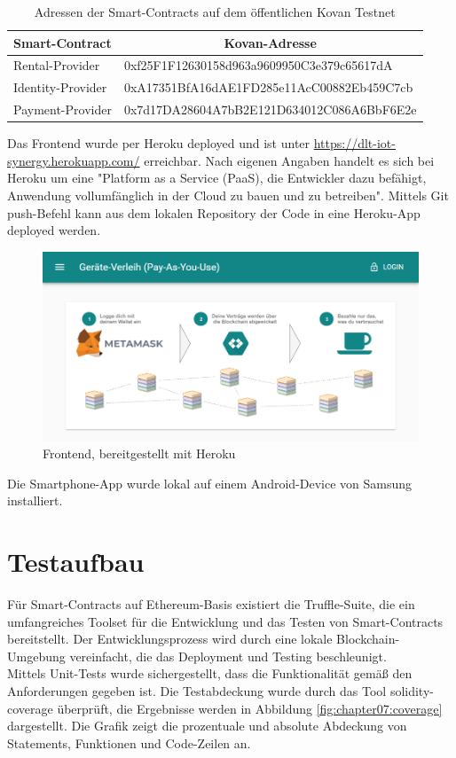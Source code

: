 \begin{table}[htbp]
\caption{Adressen der Smart-Contracts auf dem öffentlichen Kovan Testnet}
\label{tab:addresses}
\begin{tabular}{@{}ll@{}}
\toprule
\textbf{Smart-Contract} & \multicolumn{1}{c}{\textbf{Kovan-Adresse}} \\ \midrule
Rental-Provider & 0xf25F1F12630158d963a9609950C3e379c65617dA \\
Identity-Provider & 0xA17351BfA16dAE1FD285e11AcC00882Eb459C7cb \\
Payment-Provider & 0x7d17DA28604A7bB2E121D634012C086A6BbF6E2e \\ \bottomrule
\end{tabular}
\end{table}

Das Frontend wurde per Heroku deployed und ist unter \url{https://dlt-iot-synergy.herokuapp.com/} erreichbar. Nach eigenen Angaben handelt es sich bei Heroku um eine "Platform as a Service (PaaS), die Entwickler dazu befähigt, Anwendung vollumfänglich in der Cloud zu bauen und zu betreiben". Mittels Git push-Befehl kann aus dem lokalen Repository der Code in eine Heroku-App deployed werden.

\begin{figure}[h]
 \centering
 \includegraphics[width=1.0\textwidth]{gfx/screenshots/frontend.PNG}
 \caption{Frontend, bereitgestellt mit Heroku}
 \label{fig:chapter07:frontend}
\end{figure}

Die Smartphone-App wurde lokal auf einem Android-Device von Samsung installiert.

\section{Testaufbau}
\label{sec:implementation:poc:testing}
Für Smart-Contracts auf Ethereum-Basis existiert die Truffle-Suite, die ein umfangreiches Toolset für die Entwicklung und das Testen von Smart-Contracts bereitstellt. Der Entwicklungsprozess wird durch eine lokale Blockchain-Umgebung vereinfacht, die das Deployment und Testing beschleunigt.\\
Mittels Unit-Tests wurde sichergestellt, dass die Funktionalität gemäß den Anforderungen gegeben ist. Die Testabdeckung wurde durch das Tool solidity-coverage überprüft, die Ergebnisse werden in Abbildung \ref{fig:chapter07:coverage} dargestellt. Die Grafik zeigt die prozentuale und absolute Abdeckung von Statements, Funktionen und Code-Zeilen an.\\

